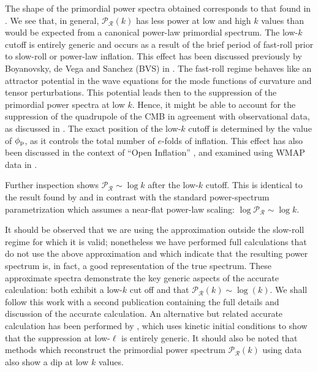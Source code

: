 The shape of the primordial power spectra obtained corresponds to that
found in \citep{lasenby_closed_2003}. We see that, in general,
$\mathcal{P}_\mathcal{R}(k)$ has less power at low and high $k$ values
than would be expected from a canonical power-law primordial spectrum.
The low-$k$ cutoff is entirely generic and occurs as a result of the
brief period of fast-roll prior to slow-roll or power-law inflation.
This effect has been discussed previously by Boyanovsky, de Vega and
Sanchez (BVS) in \citep{boyanovsky_cmb_2006}. The fast-roll regime
behaves like an attractor potential in the wave equations for the mode
functions of curvature and tensor perturbations. This potential leads
then to the suppression of the primordial power spectra at low $k$.
Hence, it might be able to account for the suppression of the
quadrupole of the CMB in agreement with observational data, as
discussed in \citep{boyanovsky_cmb_2006-1}.  The exact position of the
low-$k$ cutoff is determined by the value of $\phi_{\mathrm{p}}$, as it controls
the total number of $e$-folds of inflation. This effect has also been
discussed in the context of ``Open Inflation''
\citep{Yamauchi_strings_2011,Linde_open_1999,Linde_toy_1999}, and
examined using WMAP data in \citet{Contaldi_suppress_2003}.

Further inspection shows $\mathcal{P}_\mathcal{R} \sim \log k$ after
the low-$k$ cutoff. This is identical to the result found by
\citet{lasenby_closed_2003} and in contrast with the standard
power-spectrum parametrization which assumes a near-flat power-law
scaling: $\log\mathcal{P}_\mathcal{R}\sim \log k$. 

 
It should be observed that we are using the approximation
 outside the slow-roll regime for
which it is valid; nonetheless we have performed full calculations
that do not use the above approximation and which indicate that the
resulting power spectrum is, in fact, a good representation of the
true spectrum. These approximate spectra demonstrate the key generic
aspects of the accurate calculation: both exhibit a low-$k$ cut off
and that $\mathcal{P}_\mathcal{R}(k) \sim \log(k)$.  We shall follow
this work with a second publication containing the full details and
discussion of the accurate calculation. An alternative but related
accurate calculation has been performed by \citep{Lello_tensor_2013},
which uses kinetic initial conditions to show that the suppression at
low-$\ell$ is entirely generic. It should also be noted that methods
which reconstruct the primordial power spectrum
$\mathcal{P}_\mathcal{R}(k)$
\citep{vazquez_reconstruction,Hazra_reconstruction_2013} using data
also show a dip at low $k$ values.

